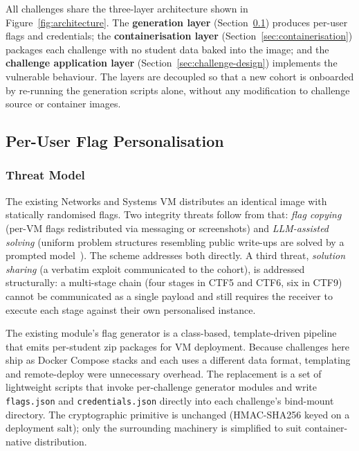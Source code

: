 All challenges share the three-layer architecture shown in
Figure~\ref{fig:architecture}. The \textbf{generation layer}
(Section~\ref{sec:flag-personalisation}) produces per-user
flags and credentials; the \textbf{containerisation layer}
(Section~\ref{sec:containerisation}) packages each challenge
with no student data baked into the image; and the
\textbf{challenge application layer}
(Section~\ref{sec:challenge-design}) implements the vulnerable
behaviour. The layers are decoupled so that a new cohort is
onboarded by re-running the generation scripts alone, without
any modification to challenge source or container images.

\subsection{Per-User Flag Personalisation}
\label{sec:flag-personalisation}

\subsubsection{Threat Model}

The existing Networks and Systems VM distributes an identical
image with statically randomised flags. Two integrity
threats follow from that: \textit{flag copying} (per-VM
flags redistributed via messaging or screenshots) and
\textit{LLM-assisted solving} (uniform problem structures
resembling public write-ups are solved by a prompted
model~\cite{ji2025}). The scheme addresses both directly. A
third threat, \textit{solution sharing} (a verbatim
exploit communicated to the cohort), is addressed
structurally: a multi-stage chain (four stages in CTF5 and
CTF6, six in CTF9) cannot be communicated as a single
payload and still requires the receiver to execute each
stage against their own personalised instance.

The existing module's flag generator is a class-based,
template-driven pipeline that emits per-student zip packages
for VM deployment. Because challenges here ship as Docker
Compose stacks and each uses a different data format,
templating and remote-deploy were unnecessary overhead. The
replacement is a set of lightweight scripts that invoke
per-challenge generator modules and write \texttt{flags.json}
and \texttt{credentials.json} directly into each challenge's
bind-mount directory. The cryptographic primitive is
unchanged (HMAC-SHA256 keyed on a deployment salt); only the
surrounding machinery is simplified to suit
container-native distribution.

